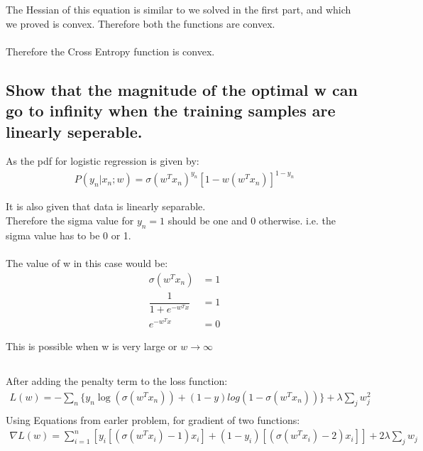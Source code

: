 \documentclass[paper=a4, fontsize=11pt]{scrartcl} %
\numberwithin{equation}{section} %
\numberwithin{figure}{section} %
\numberwithin{table}{section} %
\begin{document}
The Hessian of this equation is similar to we solved in the first part, and which we proved is convex. Therefore both the functions are convex.\\\\

Therefore the Cross Entropy function is convex.

\subsection{Show that the magnitude of the optimal w can go to infinity when the training samples are linearly seperable.}

As the pdf for logistic regression is given by:
\begin{align*}
P(y_{n}|x_{n};w) = \sigma(w^{T}x_{n})^{y_{n}}[1-w(w^{T}x_{n})]^{1-y_{n}}
\end{align*}

It is also given that data is linearly separable. \\
Therefore the sigma value for \begin{math} y_{n}=1 \end{math} should be one and 0 otherwise. i.e. the sigma value has to be 0 or 1.\\\\

The value of w in this case would be:
\begin{align*}
\sigma(w^{T}x_{n}) &= 1\\
\dfrac{1}{1+e^{-w^{T}x}}&=1\\
e^{-w^{T}x}&=0
\end{align*}

This is possible when w is very large or \begin{math} w\rightarrow \infty \end{math}

\subsection{}
After adding the penalty term to the loss function:
\begin{align}
L(w) = - \sum_{n}\{ y_{n}\log(\sigma(w^{T}x_{n})) + (1-y)log(1-\sigma(w^{T}x_{n})) \} + \lambda\sum_{j}w_{j}^{2}\\
\end{align}
Using Equations from earler problem, for gradient of two functions:
\begin{align}
\nabla L(w) = \sum_{i=1}^{n} [y_{i}[(\sigma(w^{T}x_{i})-1)x_{i}] + (1-y_{i})[(\sigma(w^{T}x_{i})-2)x_{i}]] + 2\lambda \sum_{j}w_{j}
\end{align}
\end{document}

